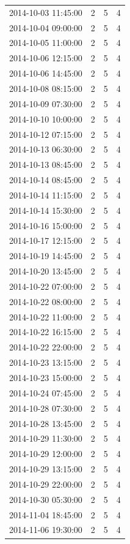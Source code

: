 \begin{tabular}{lrrr}
2014-10-03 11:45:00 & 2 & 5 & 4 \\
2014-10-04 09:00:00 & 2 & 5 & 4 \\
2014-10-05 11:00:00 & 2 & 5 & 4 \\
2014-10-06 12:15:00 & 2 & 5 & 4 \\
2014-10-06 14:45:00 & 2 & 5 & 4 \\
2014-10-08 08:15:00 & 2 & 5 & 4 \\
2014-10-09 07:30:00 & 2 & 5 & 4 \\
2014-10-10 10:00:00 & 2 & 5 & 4 \\
2014-10-12 07:15:00 & 2 & 5 & 4 \\
2014-10-13 06:30:00 & 2 & 5 & 4 \\
2014-10-13 08:45:00 & 2 & 5 & 4 \\
2014-10-14 08:45:00 & 2 & 5 & 4 \\
2014-10-14 11:15:00 & 2 & 5 & 4 \\
2014-10-14 15:30:00 & 2 & 5 & 4 \\
2014-10-16 15:00:00 & 2 & 5 & 4 \\
2014-10-17 12:15:00 & 2 & 5 & 4 \\
2014-10-19 14:45:00 & 2 & 5 & 4 \\
2014-10-20 13:45:00 & 2 & 5 & 4 \\
2014-10-22 07:00:00 & 2 & 5 & 4 \\
2014-10-22 08:00:00 & 2 & 5 & 4 \\
2014-10-22 11:00:00 & 2 & 5 & 4 \\
2014-10-22 16:15:00 & 2 & 5 & 4 \\
2014-10-22 22:00:00 & 2 & 5 & 4 \\
2014-10-23 13:15:00 & 2 & 5 & 4 \\
2014-10-23 15:00:00 & 2 & 5 & 4 \\
2014-10-24 07:45:00 & 2 & 5 & 4 \\
2014-10-28 07:30:00 & 2 & 5 & 4 \\
2014-10-28 13:45:00 & 2 & 5 & 4 \\
2014-10-29 11:30:00 & 2 & 5 & 4 \\
2014-10-29 12:00:00 & 2 & 5 & 4 \\
2014-10-29 13:15:00 & 2 & 5 & 4 \\
2014-10-29 22:00:00 & 2 & 5 & 4 \\
2014-10-30 05:30:00 & 2 & 5 & 4 \\
2014-11-04 18:45:00 & 2 & 5 & 4 \\
2014-11-06 19:30:00 & 2 & 5 & 4 \\

\end{tabular}
